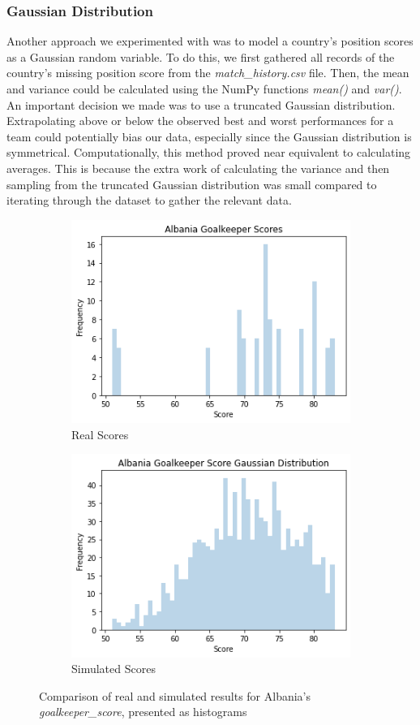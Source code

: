 \subsubsection{Gaussian Distribution}
Another approach we experimented with was to model a country's position scores as a Gaussian random variable. To do this, we first gathered all records of the country's missing position score from the \textit{match\_history.csv} file. Then, the mean and variance could be calculated using the NumPy functions \textit{mean()} and \textit{var()}. An important decision we made was to use a truncated Gaussian distribution. Extrapolating above or below the observed best and worst performances for a team could potentially bias our data, especially since the Gaussian distribution is symmetrical.
Computationally, this method proved near equivalent to calculating averages. This is because the extra work of calculating the variance and then sampling from the truncated Gaussian distribution was small compared to iterating through the dataset to gather the relevant data.
\begin{figure}[H]
        \centering
        \begin{subfigure}[b]{0.45\textwidth}
            \centering
            \includegraphics[scale=.4]{albania_scores.png}
            \caption{Real Scores}
        \end{subfigure}
        \hspace{0.5em}%
        \begin{subfigure}[b]{0.45\textwidth}
            \centering
            \includegraphics[scale=.4]{albania_gaussian.png}
            \caption{Simulated Scores}
        \end{subfigure}
        \caption{Comparison of real and simulated results for Albania's \textit{goalkeeper\_score}, presented as histograms}
        \label{fig:histograms}
\end{figure}
